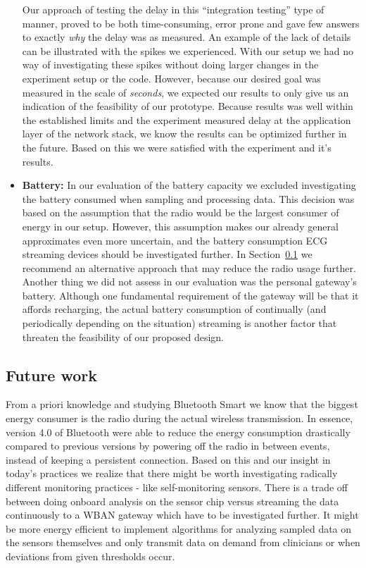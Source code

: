 \begin{itemize}
  Our approach of testing the delay in this ``integration testing'' type of manner, proved to be both time-consuming, error prone and gave few answers to exactly \emph{why} the delay was as measured. An example of the lack of details can be illustrated with the spikes we experienced. With our setup we had no way of investigating these spikes without doing larger changes in the experiment setup or the code. However, because our desired goal was measured in the scale of \emph{seconds}, we expected our results to only give us an indication of the feasibility of our prototype. Because results was well within the established limits and the experiment measured delay at the application layer of the network stack, we know the results can be optimized further in the future. Based on this we were satisfied with the experiment and it's results.

  \item [] \textbf{Battery:} In our evaluation of the battery capacity we excluded investigating the battery consumed when sampling and processing data. This decision was based on the assumption that the radio would be the largest consumer of energy in our setup. However, this assumption makes our already general approximates even more uncertain, and the battery consumption ECG streaming devices should be investigated further. In Section~\ref{sub:future_work} we recommend an alternative approach that may reduce the radio usage further. Another thing we did not assess in our evaluation was the personal gateway's battery. Although one fundamental requirement of the gateway will be that it affords recharging, the actual battery consumption of continually (and periodically depending on the situation) streaming is another factor that threaten the feasibility of our proposed design.

\end{itemize}




\subsection{Future work} %
\label{sub:future_work}


From a priori knowledge and studying Bluetooth Smart we know that the biggest energy consumer is the radio during the actual wireless transmission. In essence, version 4.0 of Bluetooth were able to reduce the energy consumption drastically compared to previous versions by powering off the radio in between events, instead of keeping a persistent connection. Based on this and our insight in today's practices we realize that there might be worth investigating radically different monitoring practices - like self-monitoring sensors. There is a trade off between doing onboard analysis on the sensor chip versus streaming the data continuously to a WBAN gateway which have to be investigated further. It might be more energy efficient to implement algorithms for analyzing sampled data on the sensors themselves and only transmit data on demand from clinicians or when deviations from given thresholds occur.

